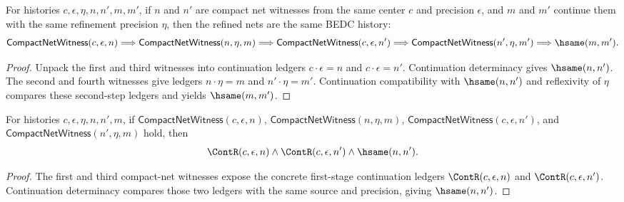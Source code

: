 \begin{theorem}
\label{thm:compact-net-witness-composite-result-deterministic}
For histories $c,\epsilon,\eta,n,n',m,m'$, if $n$ and $n'$ are compact net
witnesses from the same center $c$ and precision $\epsilon$, and $m$ and $m'$
continue them with the same refinement precision $\eta$, then the refined nets
are the same BEDC history:
$$
\mathsf{CompactNetWitness}(c,\epsilon,n)
\Longrightarrow
\mathsf{CompactNetWitness}(n,\eta,m)
\Longrightarrow
\mathsf{CompactNetWitness}(c,\epsilon,n')
\Longrightarrow
\mathsf{CompactNetWitness}(n',\eta,m')
\Longrightarrow
\hsame(m,m').
$$
\end{theorem}
\begin{proof}
Unpack the first and third witnesses into continuation ledgers
$c\cdot\epsilon=n$ and $c\cdot\epsilon=n'$. Continuation determinacy gives
$\hsame(n,n')$. The second and fourth witnesses give ledgers
$n\cdot\eta=m$ and $n'\cdot\eta=m'$. Continuation compatibility with
$\hsame(n,n')$ and reflexivity of $\eta$ compares these second-step ledgers and
yields $\hsame(m,m')$.
\end{proof}

\begin{theorem}
\label{thm:compact-net-witness-composite-middle-cont-deterministic}
For histories $c,\epsilon,\eta,n,n',m$, if
$\mathsf{CompactNetWitness}(c,\epsilon,n)$,
$\mathsf{CompactNetWitness}(n,\eta,m)$,
$\mathsf{CompactNetWitness}(c,\epsilon,n')$, and
$\mathsf{CompactNetWitness}(n',\eta,m)$ hold, then
$$
\ContR(c,\epsilon,n)\land \ContR(c,\epsilon,n')\land \hsame(n,n').
$$
\end{theorem}
\begin{proof}
The first and third compact-net witnesses expose the concrete first-stage
continuation ledgers $\ContR(c,\epsilon,n)$ and $\ContR(c,\epsilon,n')$.
Continuation determinacy compares those two ledgers with the same source and
precision, giving $\hsame(n,n')$.
\end{proof}

